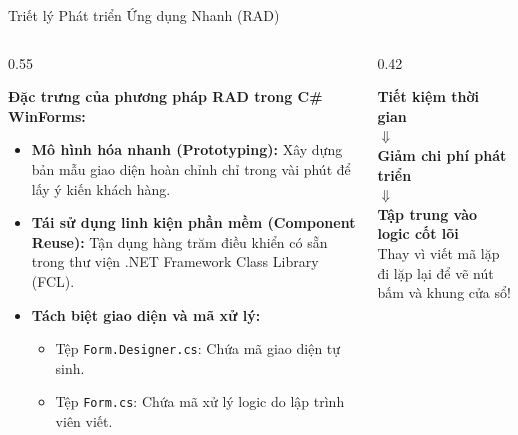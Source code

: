 \documentclass[aspectratio=169, 10pt]{beamer}
\begin{document}
\begin{frame}{Triết lý Phát triển Ứng dụng Nhanh (RAD)}
  \begin{columns}[T]
    \begin{column}{0.55\textwidth}
      \begin{block}{\textbf{Đặc trưng của phương pháp RAD trong C\# WinForms:}}
        \begin{itemize}\small
          \item \textbf{Mô hình hóa nhanh (Prototyping):} Xây dựng bản mẫu giao diện hoàn chỉnh chỉ trong vài phút để lấy ý kiến khách hàng.
          \item \textbf{Tái sử dụng linh kiện phần mềm (Component Reuse):} Tận dụng hàng trăm điều khiển có sẵn trong thư viện .NET Framework Class Library (FCL).
          \item \textbf{Tách biệt giao diện và mã xử lý:}
            \begin{itemize}\footnotesize
              \item Tệp \texttt{Form.Designer.cs}: Chứa mã giao diện tự sinh.
              \item Tệp \texttt{Form.cs}: Chứa mã xử lý logic do lập trình viên viết.
            \end{itemize}
        \end{itemize}
      \end{block}
    \end{column}

    \begin{column}{0.42\textwidth}
      \begin{tcolorbox}[colback=UniGreen!10,colframe=UniGreen,title=\textbf{Lợi thế cạnh tranh của RAD:},fonttitle=\small\bfseries]
        \begin{center}
          \textbf{Tiết kiệm thời gian}\\[1mm]
          $\Downarrow$\\[1mm]
          \textbf{Giảm chi phí phát triển}\\[1mm]
          $\Downarrow$\\[1mm]
          \textbf{Tập trung vào logic cốt lõi}\\[1mm]
          Thay vì viết mã lặp đi lặp lại để vẽ nút bấm và khung cửa sổ!
        \end{center}
      \end{tcolorbox}
    \end{column}
  \end{columns}
\end{frame}
\end{document}
